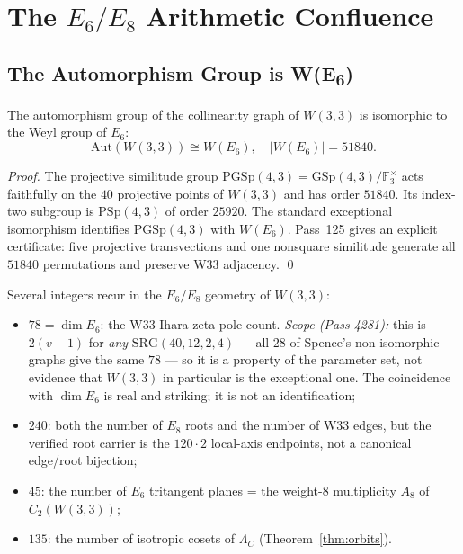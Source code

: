 \section{\texorpdfstring{The $E_6/E_8$ Arithmetic Confluence}
{The E6/E8 Arithmetic Confluence}}
\label{sec:e6e8}

\subsection{The Automorphism Group is W(E\textsubscript{6})}

\begin{theorem}
\label{thm:aut}
The automorphism group of the collinearity graph of $W(3,3)$ is isomorphic to
the Weyl group of $E_6$:
$$\mathrm{Aut}(W(3,3)) \cong W(E_6), \quad |W(E_6)| = 51840.$$
\end{theorem}

\begin{proof}
The projective similitude group
$\mathrm{PGSp}(4,3)=\mathrm{GSp}(4,3)/\mathbb F_3^\times$ acts faithfully on
the $40$ projective points of $W(3,3)$ and has order $51840$. Its index-two
subgroup is $\mathrm{PSp}(4,3)$ of order $25920$. The standard exceptional
isomorphism identifies $\mathrm{PGSp}(4,3)$ with $W(E_6)$. Pass~125 gives an
explicit certificate: five projective transvections and one nonsquare
similitude generate all $51840$ permutations and preserve W33 adjacency.
\qed
\end{proof}

\begin{remark}
Several integers recur in the $E_6/E_8$ geometry of $W(3,3)$:
\begin{itemize}
\item $78 = \dim E_6$: the W33 Ihara-zeta pole count. \emph{Scope (Pass 4281):} this is
$2(v-1)$ for \emph{any} $\mathrm{SRG}(40,12,2,4)$ --- all $28$ of Spence's non-isomorphic
graphs give the same $78$ --- so it is a property of the parameter set, not evidence that
$W(3,3)$ in particular is the exceptional one. The coincidence with $\dim E_6$ is real and
striking; it is not an identification;
\item $240$: both the number of $E_8$ roots and the number of W33 edges, but
the verified root carrier is the $120\cdot2$ local-axis endpoints, not a
canonical edge/root bijection;
\item $45$: the number of $E_6$ tritangent planes = the weight-8 multiplicity $A_8$ of $C_2(W(3,3))$;
\item $135$: the number of isotropic cosets of $\Lambda_C$ (Theorem~\ref{thm:orbits}).
\end{itemize}
\end{remark}

